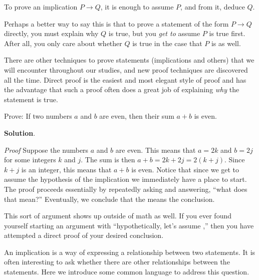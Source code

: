 \documentclass[11pt,]{book}
\makeatletter
\theoremstyle{ptxplainnotitle}
\theoremstyle{ptxplaintitle}
\renewcommand*{\proofname}{Proof}
\renewenvironment{proof}[1][\proofname]{\par
  \pushQED{\qed}%
  \normalfont \topsep6\p@\@plus6\p@\relax
  \trivlist
  \item\relax
    {\itshape
    #1\@addpunct{.}}\hspace\labelsep\ignorespaces
}{%
  \popQED\endtrivlist\@endpefalse
}
\theoremstyle{ptxdefinitionnotitle}
\theoremstyle{ptxdefinitiontitle}
\theoremstyle{ptxdefinitionnotitle}
\theoremstyle{ptxdefinitiontitle}
\theoremstyle{ptxdefinitionnotitle}
\theoremstyle{ptxdefinitiontitle}
\theoremstyle{ptxdefinitiontitlenonumber}
\theoremstyle{ptxdefinitiontitlenonumber}
\numberwithin{equation}{chapter}
\newcommand{\imp}{\rightarrow}
\makeatother
\begin{document}
\begin{assemblage}\label{assemblage-28}
\hypertarget{p-1712}{}%
To prove an implication \(P \imp Q\), it is enough to assume \(P\), and from it, deduce \(Q\).%
\end{assemblage}
\hypertarget{p-1713}{}%
Perhaps a better way to say this is that to prove a statement of the form \(P \imp Q\) directly, you must explain why \(Q\) is true, but you \emph{get to} assume \(P\) is true first.  After all, you only care about whether \(Q\) is true in the case that \(P\) is as well.%
\par
\hypertarget{p-1714}{}%
There are other techniques to prove statements (implications and others) that we will encounter throughout our studies, and new proof techniques are discovered all the time. Direct proof is the easiest and most elegant style of proof and has the advantage that such a proof often does a great job of explaining \emph{why} the statement is true.%
\begin{example}\label{example-50}
\hypertarget{p-1715}{}%
Prove: If two numbers \(a\) and \(b\) are even, then their sum \(a+b\) is even.%
\par\smallskip%
\noindent\textbf{Solution}.\hypertarget{solution-196}{}\quad%
\begin{proof}\hypertarget{proof-20}{}
\hypertarget{p-1716}{}%
Suppose the numbers \(a\) and \(b\) are even. This means that  \(a = 2k\) and \(b=2j\) for some integers \(k\) and \(j\). The sum is then \(a+b = 2k+2j = 2(k+j)\). Since \(k+j\) is an integer, this means that \(a+b\) is even.%
\end{proof}
\hypertarget{p-1717}{}%
Notice that since we get to assume the hypothesis of the implication we immediately have a place to start. The proof proceeds essentially by repeatedly asking and answering, ``what does that mean?''  Eventually, we conclude that the means the conclusion.%
\end{example}
\hypertarget{p-1718}{}%
This sort of argument shows up outside of math as well. If you ever found yourself starting an argument with ``hypothetically, let's assume \textellipsis{},'' then you have attempted a direct proof of your desired conclusion.%
\par
\hypertarget{p-1719}{}%
An implication is a way of expressing a relationship between two statements.  It is often interesting to ask whether there are other relationships between the statements.  Here we introduce some common language to address this question.%
\end{document}
